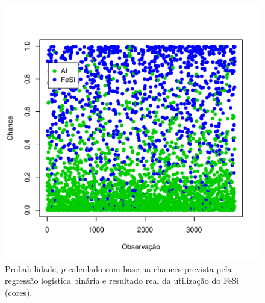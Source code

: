 	\begin{figure}[H]
		\centering
		\includegraphics[scale=0.55, bb=0 0 432 432, trim=0in 20pt 0in 40pt]{figures/fig02.pdf}
		\caption{Probabilidade, $p$ calculado com base na chances prevista pela regressão logística binária e resultado real da utilização do FeSi (cores).}
		\label{fig:razao}
	\end{figure}		

